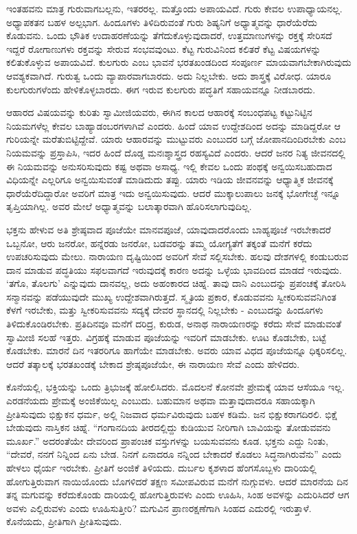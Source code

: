 ಇಂತಹವನು ಮಾತ್ರ ಗುರುವಾಗಬಲ್ಲನು, ಇತರರಲ್ಲ. ಮತ್ತೊಂದು ಅಪಾಯವಿದೆ. ಗುರು ಕೇವಲ ಉಪಾಧ್ಯಾಯನಲ್ಲ. ಅಧ್ಯಾಪಕತನ ಬಹಳ ಅಲ್ಪಭಾಗ. ಹಿಂದೂಗಳು ತಿಳಿದಿರುವಂತೆ ಗುರು ಶಿಷ್ಯನಿಗೆ ಅಧ್ಯಾತ್ಮವನ್ನು ಧಾರೆಯೆರೆದು ಕೊಡುವನು. ಒಂದು ಭೌತಿಕ ಉದಾಹರಣೆಯನ್ನು ತೆಗೆದುಕೊಳ್ಳುವುದಾದರೆ, ಉತ್ತಮಾಣುಗಳನ್ನು ರಕ್ತಕ್ಕೆ ಸೇರಿಸದೆ ಇದ್ದರೆ ರೋಗಾಣುಗಳು ರಕ್ತವನ್ನು ಸೇರುವ ಸಂಭವವುಂಟು. ಕೆಟ್ಟ ಗುರುವಿನಿಂದ ಕಲಿತರೆ ಕೆಟ್ಟ ವಿಷಯಗಳನ್ನು ಕಲಿತುಕೊಳ್ಳುವ ಅಪಾಯವಿದೆ. ಕುಲಗುರು ಎಂಬ ಭಾವನೆ ಭರತಖಂಡದಿಂದ ಸಂಪೂರ್ಣ ಮಾಯವಾಗಬೇಕಾಗಿರುವುದು ಆವಶ್ಯಕವಾಗಿದೆ. ಗುರುತ್ವ ಒಂದು ವ್ಯಾಪಾರವಾಗಬಾರದು. ಅದು ನಿಲ್ಲಬೇಕು. ಅದು ಶಾಸ್ತ್ರಕ್ಕೆ ವಿರೋಧ. ಯಾರೂ ಕುಲಗುರುಗಳೆಂದು ಹೇಳಿಕೊಳ್ಳಬಾರದು. ಈಗ ಇರುವ ಕುಲಗುರು ಪದ್ಧತಿಗೆ ಸಹಾಯವನ್ನೂ ನೀಡಬಾರದು.

ಆಹಾರದ ವಿಷಯವನ್ನು ಕುರಿತು ಸ್ವಾಮೀಜಿಯವರು, ಈಗಿನ ಕಾಲದ ಆಹಾರಕ್ಕೆ ಸಂಬಂಧಪಟ್ಟ ಕಟ್ಟುನಿಟ್ಟಿನ ನಿಯಮಗಳೆಲ್ಲ ಕೇವಲ ಬಾಹ್ಯಾಡಂಬರಗಳಾಗಿವೆ ಎಂದರು. ಹಿಂದೆ ಯಾವ ಉದ್ದೇಶದಿಂದ ಅದನ್ನು ಮಾಡಿದ್ದರೋ ಆ ಗುರಿಯನ್ನೇ ಮರೆತುಬಿಟ್ಟಿದ್ದೇವೆ. ಯಾರು ಆಹಾರವನ್ನು ಮುಟ್ಟುವರು ಎಂಬುದರ ಬಗ್ಗೆ ಜೋಪಾನದಿಂದಿರಬೇಕು ಎಂಬ ನಿಯಮವನ್ನು ಪ್ರಸ್ತಾಪಿಸಿ, ಇದರ ಹಿಂದೆ ದೊಡ್ಡ ಮನಃಶ್ಶಾಸ್ತ್ರದ ರಹಸ್ಯವಿದೆ ಎಂದರು. ಆದರೆ ಜನರ ನಿತ್ಯ ಜೀವನದಲ್ಲಿ ಈ ನಿಯಮವನ್ನು ಅನುಸರಿಸುವುದು ಕಷ್ಟ ಅಥವಾ ಅಸಾಧ್ಯ. ಇಲ್ಲಿ ಕೇವಲ ಒಂದು ಪಂಥಕ್ಕೆ ಅನ್ವಯಿಸಬಹುದಾದ ವಿಧಿಯನ್ನೇ ಎಲ್ಲರಿಗೂ ಅನ್ವಯಿಸುವಂತೆ ಮಾಡಿದುದು ತಪ್ಪು. ಯಾರು ಇಡಿಯ ಜೀವನವನ್ನು ಆಧ್ಯಾತ್ಮಿಕ ಜೀವನಕ್ಕೆ ಧಾರೆಯೆರೆದಿದ್ದಾರೋ ಅವರಿಗೆ ಮಾತ್ರ ಇದು ಅನ್ವಯಿಸುವುದು. ಆದರೆ ಮುಕ್ಕಾಲುಪಾಲು ಜನಕ್ಕೆ ಭೋಗೇಚ್ಛೆ ಇನ್ನೂ ತೃಪ್ತಿಯಾಗಿಲ್ಲ. ಅವರ ಮೇಲೆ ಅಧ್ಯಾತ್ಮವನ್ನು ಬಲಾತ್ಕಾರವಾಗಿ ಹೊರಿಸಲಾಗುವುದಿಲ್ಲ.

ಭಕ್ತನು ಹೇಳುವ ಅತಿ ಶ್ರೇಷ್ಠವಾದ ಪೂಜೆಯೇ ಮಾನವಪೂಜೆ, ಯಾವುದಾದರೊಂದು ಬಾಹ್ಯಪೂಜೆ ಇರಬೇಕಾದರೆ ಒಬ್ಬನೋ, ಆರು ಜನರೋ, ಹನ್ನೆರಡು ಜನರೋ, ಬಡವರನ್ನು ತಮ್ಮ ಯೋಗ್ಯತೆಗೆ ತಕ್ಕಂತೆ ಮನೆಗೆ ಕರೆದು ಉಪಚರಿಸುವುದು ಮೇಲು. ನಾರಾಯಣ ದೃಷ್ಟಿಯಿಂದ ಅವರಿಗೆ ಸೇವೆ ಸಲ್ಲಿಸಬೇಕು. ಹಲವು ದೇಶಗಳಲ್ಲಿ ಕಂಡುಬರುವ ದಾನ ಮಾಡುವ ಪದ್ಧತಿಯು ಸಫಲವಾಗದೆ ಇರುವುದಕ್ಕೆ ಕಾರಣ ಅದನ್ನು ಒಳ್ಳೆಯ ಭಾವದಿಂದ ಮಾಡದೆ ಇರುವುದು. ‘ತಗೊ, ತೊಲಗು’ ಎನ್ನುವುದು ದಾನವಲ್ಲ, ಅದು ಅಹಂಕಾರದ ಚಿಹ್ನೆ. ತಾವು ದಾನಿ ಎಂಬುದನ್ನು ಪ್ರಪಂಚಕ್ಕೆ ತೋರಿಸಿ ಸನ್ಮಾನವನ್ನು ಪಡೆಯುವುದೇ ಮುಖ್ಯ ಉದ್ದೇಶವಾಗಿರುತ್ತದೆ. ಸ್ಮೃತಿಯ ಪ್ರಕಾರ, ಕೊಡುವವನು ಸ್ವೀಕರಿಸುವವನಿಗಿಂತ ಕೆಳಗೆ ಇರಬೇಕು, ಮತ್ತು ಸ್ವೀಕರಿಸುವವನು ಸದ್ಯಕ್ಕೆ ದೇವರ ಸ್ಥಾನದಲ್ಲಿ ನಿಲ್ಲಬೇಕು - ಎಂಬುದನ್ನು ಹಿಂದೂಗಳು ತಿಳಿದುಕೊಂಡಿರಬೇಕು. ಪ್ರತಿದಿನವೂ ಮನೆಗೆ ದರಿದ್ರ, ಕುರುಡ, ಅನಾಥ ನಾರಾಯಣರನ್ನು ಕರೆದು ಸೇವೆ ಮಾಡುವಂತೆ ಸ್ವಾಮೀಜಿ ಸಲಹೆ ಇತ್ತರು. ವಿಗ್ರಹಕ್ಕೆ ಮಾಡುವ ಪೂಜೆಯನ್ನು ಇವರಿಗೆ ಮಾಡಬೇಕು. ಊಟ ಕೊಡಬೇಕು, ಬಟ್ಟೆ ಕೊಡಬೇಕು. ಮಾರನೆ ದಿನ ಇತರರಿಗೂ ಹಾಗೆಯೇ ಮಾಡಬೇಕು. ಅವರು ಯಾವ ವಿಧದ ಪೂಜೆಯನ್ನೂ ಧಿಕ್ಕರಿಸಲಿಲ್ಲ. ಆದರೆ ತತ್ಕಾಲಕ್ಕೆ ಭರತಖಂಡಕ್ಕೆ ಬೇಕಾದ ಶ್ರೇಷ್ಠಪೂಜೆಯೇ, ಈ ನಾರಾಯಣ ಸೇವೆ ಎಂದು ಹೇಳಿದರು.

ಕೊನೆಯಲ್ಲಿ, ಭಕ್ತಿಯನ್ನು ಒಂದು ತ್ರಿಭುಜಕ್ಕೆ ಹೋಲಿಸಿದರು. ಮೊದಲನೆ ಕೋನವೇ ಪ್ರೇಮಕ್ಕೆ ಯಾವ ಆಸೆಯೂ ಇಲ್ಲ. ಎರಡನೆಯದು ಪ್ರೇಮಕ್ಕೆ ಅಂಜಿಕೆಯಿಲ್ಲ ಎಂಬುದು. ಬಹುಮಾನ ಅಥವಾ ಮತ್ತಾವುದಾದರೂ ಸಹಾಯಕ್ಕಾಗಿ ಪ್ರೀತಿಸುವುದು ಭಿಕ್ಷುಕನ ಧರ್ಮ, ಅಲ್ಲಿ ನಿಜವಾದ ಧರ್ಮವಿರುವುದು ಬಹಳ ಕಡಿಮೆ. ಜನ ಭಿಕ್ಷುಕರಾಗದಿರಲಿ. ಭಿಕ್ಷೆ ಬೇಡುವುದು ನಾಸ್ತಿಕನ ಚಿಹ್ನೆ. “ಗಂಗಾನದಿಯ ತೀರದಲ್ಲಿದ್ದು ಕುಡಿಯುವ ನೀರಿಗಾಗಿ ಬಾವಿಯನ್ನು ತೋಡುವವನು ಮೂರ್ಖ.” ಅದರಂತೆಯೇ ದೇವರಿಂದ ಪ್ರಾಪಂಚಿಕ ವಸ್ತುಗಳನ್ನು ಬಯಸುವವನು ಕೂಡ. ಭಕ್ತನು ಎದ್ದು ನಿಂತು, “ದೇವರೆ, ನನಗೆ ನಿನ್ನಿಂದ ಏನು ಬೇಡ. ನಿನಗೆ ಏನಾದರೂ ನನ್ನಿಂದ ಬೇಕಾದರೆ ಕೊಡಲು ಸಿದ್ಧನಾಗಿರುವೆನು” ಎಂದು ಹೇಳಲು ಧೈರ್ಯ ಇರಬೇಕು. ಪ್ರೀತಿಗೆ ಅಂಜಿಕೆ ತಿಳಿಯದು. ದುರ್ಬಲ ಕೃಶಳಾದ ಹೆಂಗಸೊಬ್ಬಳು ದಾರಿಯಲ್ಲಿ ಹೋಗುತ್ತಿರುವಾಗ ನಾಯಿಯೊಂದು ಬೊಗಳಿದರೆ ತಕ್ಷಣ ಸಮೀಪವಿರುವ ಮನೆಗೆ ನುಗ್ಗುವಳು. ಆದರೆ ಮಾರನೆಯ ದಿನ ತನ್ನ ಮಗುವನ್ನು ಕರೆದುಕೊಂಡು ದಾರಿಯಲ್ಲಿ ಹೋಗುತ್ತಿರುವಳು ಎಂದು ಊಹಿಸಿ, ಸಿಂಹ ಅವಳನ್ನು ಎದುರಿಸಿದರೆ ಆಗ ಅವಳು ಎಲ್ಲಿರುವಳು ಎಂದು ಊಹಿಸುತ್ತೀರಿ? ಮಗುವಿನ ಪ್ರಾಣರಕ್ಷಣೆಗಾಗಿ ಸಿಂಹದ ಎದುರಲ್ಲಿ ಇರುತ್ತಾಳೆ. ಕೊನೆಯದು, ಪ್ರೀತಿಗಾಗಿ ಪ್ರೀತಿಸುವುದು.

